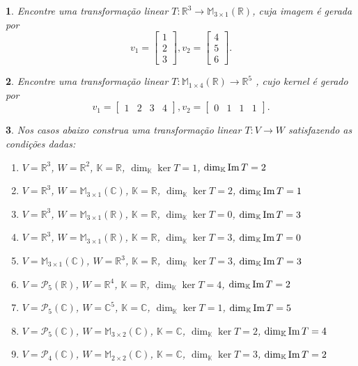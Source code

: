 \documentclass[12pt]{exam}
\newtheorem{exercicio}{}
\newcommand{\im}{{\rm Im\,}}
\newcommand{\real}{\mathbb{R}}
\newcommand{\complex}{\mathbb{C}}
\newcommand{\cp}[1]{\mathbb{#1}}
\begin{document}
\begin{exercicio}
  Encontre uma transforma\c{c}\~ao linear $T : \real^3 \to \cp{M}_{3 \times 1}(\real)$, cuja imagem \'e gerada por
  \[
    v_1 = \begin{bmatrix}
      1\\2\\3
    \end{bmatrix}, v_2 = \begin{bmatrix}
      4\\5\\6
    \end{bmatrix}.
  \]
\end{exercicio}

\begin{exercicio}
  Encontre uma transforma\c{c}\~ao linear $T : \cp{M}_{1 \times 4}(\real) \to \real^5$ , cujo kernel \'e gerado por
  \[
    v_1 = \begin{bmatrix}
      1 & 2 & 3 & 4
    \end{bmatrix}, v_2 = \begin{bmatrix}
      0 & 1 & 1 & 1
    \end{bmatrix}.
  \]
\end{exercicio}

\begin{exercicio}
  Nos casos abaixo construa uma transforma\c{c}\~ao linear $T : V \to W$ satisfazendo as condi\c{c}\~oes dadas:
  \begin{enumerate}[label=({\alph*})]
    \item $V = \real^3$, $W = \real^2$, $\cp{K} = \real$, $\dim_\cp{K} \ker T = 1$, $\dim_\cp{K} \im T = 2$
    \item $V = \real^3$, $W = \cp{M}_{3\times 1}(\complex)$, $\cp{K} = \real$, $\dim_\cp{K} \ker T = 2$, $\dim_\cp{K} \im T = 1$
    \item $V = \real^3$, $W = \cp{M}_{3\times 1}(\real)$, $\cp{K} = \real$, $\dim_\cp{K} \ker T = 0$, $\dim_\cp{K} \im T = 3$
    \item $V = \real^3$, $W = \cp{M}_{3\times 1}(\real)$, $\cp{K} = \real$, $\dim_\cp{K} \ker T = 3$, $\dim_\cp{K} \im T = 0$
    \item $V = \cp{M}_{3\times 1}(\complex)$, $W = \real^3$, $\cp{K} = \real$, $\dim_\cp{K} \ker T = 3$, $\dim_\cp{K} \im T = 3$
    \item $V = \mathcal{P}_5(\real)$, $W = \real^4$, $\cp{K} = \real$, $\dim_\cp{K} \ker T = 4$, $\dim_\cp{K} \im T = 2$
    \item $V = \mathcal{P}_5(\complex)$, $W = \complex^5$, $\cp{K} = \complex$, $\dim_\cp{K} \ker T = 1$, $\dim_\cp{K} \im T = 5$
    \item $V = \mathcal{P}_5(\complex)$, $W = \cp{M}_{3\times 2}(\complex)$, $\cp{K} = \complex$, $\dim_\cp{K} \ker T = 2$, $\dim_\cp{K} \im T = 4$
    \item $V = \mathcal{P}_4(\complex)$, $W = \cp{M}_{2\times 2}(\complex)$, $\cp{K} = \complex$, $\dim_\cp{K} \ker T = 3$, $\dim_\cp{K} \im T = 2$
  \end{enumerate}
\end{exercicio}
\end{document}
